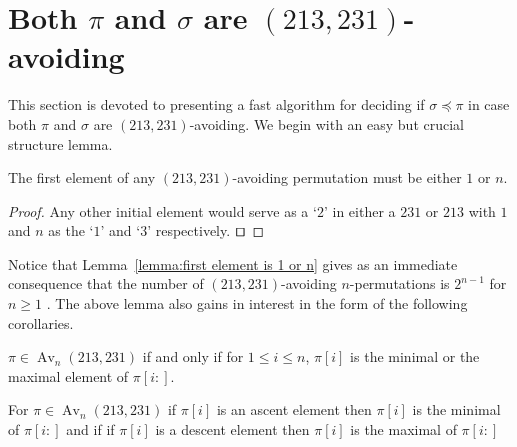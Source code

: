 \documentclass[a4paper]{llncs}
\DeclareMathOperator{\AV}{Av}
\DeclareMathOperator{\Avd}{Av}
\newcommand\Av[2]{\Avd_{{#1}}({#2})}
\DeclareMathOperator{\stripea}{s}
\newcommand{\stripe}[2]{\stripea_{{#1}}[{#2}]}
\newcounter{num}
\newcommand{\dstep}{d}
\newcommand{\ustep}{a}
\begin{document}


\section{Both $\pi$ and $\sigma$ are $(213,231)$-avoiding}
\label{section:both are (231,213)-avoiding}

This section is devoted to presenting a fast algorithm for deciding if
$\sigma \preceq \pi$
in case both $\pi$ and $\sigma$ are $(213,231)$-avoiding.
We begin with an easy but crucial structure lemma.

\begin{lemma}[Folklore]
\label{lemma:first element is 1 or n}
The first element of any $(213,231)$-avoiding permutation
must be either $1$ or $n$.
\end{lemma}

\begin{proof}
Any other initial element would serve as a `$2$' in either a
$231$ or $213$ with $1$ and $n$ as the `$1$' and `$3$' respectively.
$\qed$
\end{proof}

Notice that Lemma~\ref{lemma:first element is 1 or n} gives as an
immediate consequence that the number of $(213,231)$-avoiding $n$-permutations
is $2^{n-1}$ for $n\geq 1$ \cite{Simion:Schmidt:EJC:1985}.
The above lemma also gains in interest in the form of the following corollaries.

\begin{corollary}
\label{corollary:minmaxelement}
$\pi \in \AV_n(213,231)$ if and only if for $1 \leq i \leq n$,
$\pi[i]$ is the minimal or the maximal element of $\pi[i:]$.
\end{corollary}

\begin{corollary}
\label{corollary:max is ascent}
For $\pi \in \AV_n(213,231)$ if $\pi[i]$ is an ascent element then $\pi[i]$ is the minimal of $\pi[i:]$
and if if $\pi[i]$ is a descent element then $\pi[i]$ is the maximal of $\pi[i:]$
\end{corollary}

%
\end{document}

